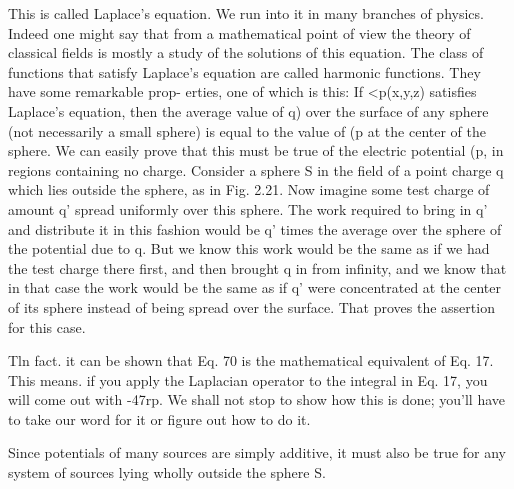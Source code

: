 This is called Laplace's equation. We run into it in many branches
of physics. Indeed one might say that from a mathematical point of
view the theory of classical fields is mostly a study of the solutions of
this equation. The class of functions that satisfy Laplace's equation
are called harmonic functions. They have some remarkable prop-
erties, one of which is this: If <p(x,y,z) satisfies Laplace's equation,
then the average value of q) over the surface of any sphere (not necessarily
a small sphere) is equal to the value of (p at the center of the
sphere. We can easily prove that this must be true of the electric
potential (p, in regions containing no charge. Consider a sphere S
in the field of a point charge q which lies outside the sphere, as in
Fig. 2.21. Now imagine some test charge of amount q' spread uniformly
over this sphere. The work required to bring in q' and distribute
it in this fashion would be q' times the average over the sphere
of the potential due to q. But we know this work would be the same
as if we had the test charge there first, and then brought q in from
infinity, and we know that in that case the work would be the same as
if q' were concentrated at the center of its sphere instead of being
spread over the surface. That proves the assertion for this case.

Tln fact. it can be shown that Eq. 70 is the mathematical equivalent of Eq. 17. This
means. if you apply the Laplacian operator to the integral in Eq. 17, you will come
out with -47rp. We shall not stop to show how this is done; you'll have to take our
word for it or figure out how to do it.

Since potentials of many sources are simply additive, it must also be
true for any system of sources lying wholly outside the sphere S.

